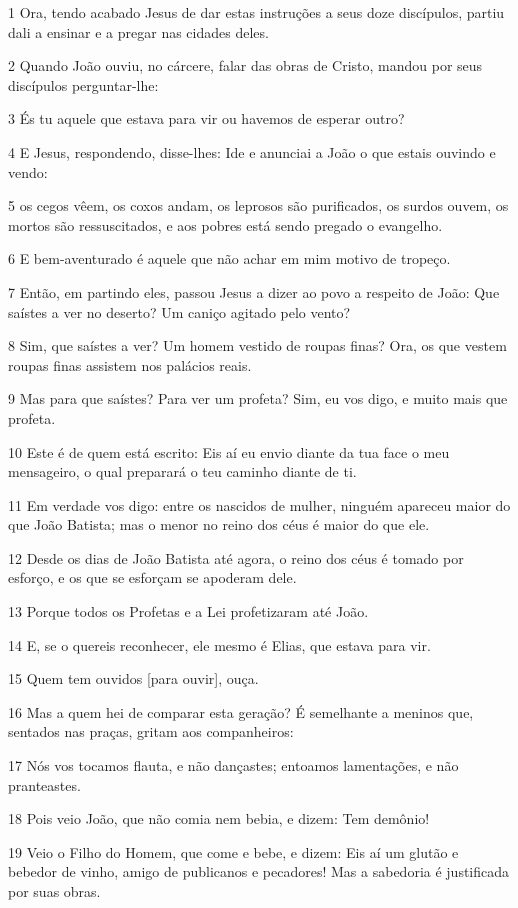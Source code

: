 \par 1 Ora, tendo acabado Jesus de dar estas instruções a seus doze discípulos, partiu dali a ensinar e a pregar nas cidades deles.
\par 2 Quando João ouviu, no cárcere, falar das obras de Cristo, mandou por seus discípulos perguntar-lhe:
\par 3 És tu aquele que estava para vir ou havemos de esperar outro?
\par 4 E Jesus, respondendo, disse-lhes: Ide e anunciai a João o que estais ouvindo e vendo:
\par 5 os cegos vêem, os coxos andam, os leprosos são purificados, os surdos ouvem, os mortos são ressuscitados, e aos pobres está sendo pregado o evangelho.
\par 6 E bem-aventurado é aquele que não achar em mim motivo de tropeço.
\par 7 Então, em partindo eles, passou Jesus a dizer ao povo a respeito de João: Que saístes a ver no deserto? Um caniço agitado pelo vento?
\par 8 Sim, que saístes a ver? Um homem vestido de roupas finas? Ora, os que vestem roupas finas assistem nos palácios reais.
\par 9 Mas para que saístes? Para ver um profeta? Sim, eu vos digo, e muito mais que profeta.
\par 10 Este é de quem está escrito: Eis aí eu envio diante da tua face o meu mensageiro, o qual preparará o teu caminho diante de ti.
\par 11 Em verdade vos digo: entre os nascidos de mulher, ninguém apareceu maior do que João Batista; mas o menor no reino dos céus é maior do que ele.
\par 12 Desde os dias de João Batista até agora, o reino dos céus é tomado por esforço, e os que se esforçam se apoderam dele.
\par 13 Porque todos os Profetas e a Lei profetizaram até João.
\par 14 E, se o quereis reconhecer, ele mesmo é Elias, que estava para vir.
\par 15 Quem tem ouvidos [para ouvir], ouça.
\par 16 Mas a quem hei de comparar esta geração? É semelhante a meninos que, sentados nas praças, gritam aos companheiros:
\par 17 Nós vos tocamos flauta, e não dançastes; entoamos lamentações, e não pranteastes.
\par 18 Pois veio João, que não comia nem bebia, e dizem: Tem demônio!
\par 19 Veio o Filho do Homem, que come e bebe, e dizem: Eis aí um glutão e bebedor de vinho, amigo de publicanos e pecadores! Mas a sabedoria é justificada por suas obras.
